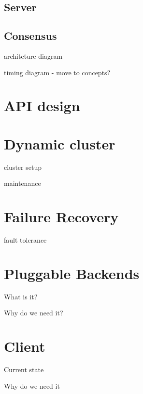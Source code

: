 \subsection{Server}

\subsection{Consensus}

{architeture diagram}

{timing diagram} - move to concepts?

\section{API design}

\section{Dynamic cluster}

cluster setup

maintenance

\section{Failure Recovery}

fault tolerance

\section{Pluggable Backends}

What is it?

Why do we need it?

\section{Client}

Current state

Why do we need it


